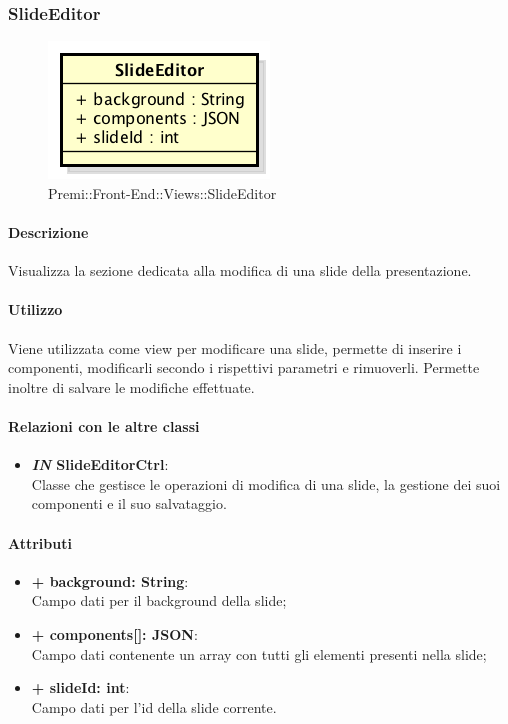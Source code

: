 	
\subsubsection{SlideEditor}
	\begin{figure}[h]
		\centering
		\includegraphics[width=0.3\linewidth]{img/premi_front_end_views_slideeditor}
		\caption[Premi::Front-End::Views::SlideEditor]{Premi::Front-End::Views::SlideEditor}
	\end{figure}
	
	\paragraph{Descrizione}
	Visualizza la sezione dedicata alla modifica di una slide della presentazione.
	
	\paragraph{Utilizzo}
	Viene utilizzata come view per modificare una slide, permette di inserire i componenti, modificarli secondo i rispettivi parametri e rimuoverli. Permette inoltre di salvare le modifiche effettuate.
	
	\paragraph{Relazioni con le altre classi}
	\begin{itemize}
		\item \textbf{\textit{IN} SlideEditorCtrl}:\\
		Classe che gestisce le operazioni di modifica di una slide, la gestione dei suoi componenti e il suo salvataggio.
	\end{itemize}
	
	\paragraph{Attributi}
	\begin{itemize}
		\item \textbf{+ background: String}:\\
			Campo dati per il background della slide;
		\item \textbf{+ components[]: JSON}:\\
			Campo dati contenente un array con tutti gli elementi presenti nella slide;
		\item \textbf{+ slideId: int}:\\
			Campo dati per l'id della slide corrente.

	\end{itemize}